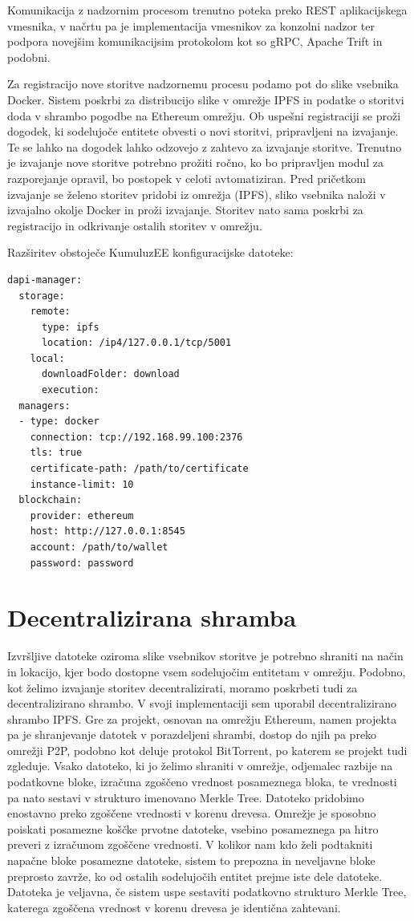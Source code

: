 \documentclass[a4paper, 12pt]{book}
\begin{document}
Komunikacija z nadzornim procesom trenutno poteka preko REST aplikacijskega vmesnika, v načrtu pa je implementacija vmesnikov za konzolni nadzor ter podpora novejšim komunikacijsim protokolom kot so gRPC, Apache Trift in podobni.

Za registracijo nove storitve nadzornemu procesu podamo pot do slike vsebnika Docker.
Sistem poskrbi za distribucijo slike v omrežje IPFS in podatke o storitvi doda v shrambo pogodbe na Ethereum omrežju.
Ob uspešni registraciji se proži dogodek, ki sodelujoče entitete obvesti o novi storitvi, pripravljeni na izvajanje.
Te se lahko na dogodek lahko odzovejo z zahtevo za izvajanje storitve.
Trenutno je izvajanje nove storitve potrebno prožiti ročno, ko bo pripravljen modul za razporejanje opravil, bo postopek v celoti avtomatiziran.
Pred pričetkom izvajanje se želeno storitev pridobi iz omrežja (IPFS), sliko vsebnika naloži v izvajalno okolje Docker in proži izvajanje.
Storitev nato sama poskrbi za registracijo in odkrivanje ostalih storitev v omrežju.

Razširitev obstoječe KumuluzEE konfiguracijske datoteke:

\begin{lstlisting}
dapi-manager:
  storage:
    remote:
      type: ipfs
      location: /ip4/127.0.0.1/tcp/5001
    local:
      downloadFolder: download
      execution:
  managers:
  - type: docker
    connection: tcp://192.168.99.100:2376
    tls: true
    certificate-path: /path/to/certificate
    instance-limit: 10
  blockchain:
    provider: ethereum
    host: http://127.0.0.1:8545
    account: /path/to/wallet
    password: password
\end{lstlisting}

\section{Decentralizirana shramba}
Izvršljive datoteke oziroma slike vsebnikov storitve je potrebno shraniti na način in lokacijo, kjer bodo dostopne vsem sodelujočim entitetam v omrežju.
Podobno, kot želimo izvajanje storitev decentralizirati, moramo poskrbeti tudi za decentralizirano shrambo.
V svoji implementaciji sem uporabil decentralizirano shrambo IPFS.
Gre za projekt, osnovan na omrežju Ethereum, namen projekta pa je shranjevanje datotek v porazdeljeni shrambi, dostop do njih pa preko omrežji P2P, podobno kot deluje protokol BitTorrent, po katerem se projekt tudi zgleduje.
Vsako datoteko, ki jo želimo shraniti v omrežje, odjemalec razbije na podatkovne bloke, izračuna zgoščeno vrednost posameznega bloka, te vrednosti pa nato sestavi v strukturo imenovano Merkle Tree.
Datoteko pridobimo enostavno preko zgoščene vrednosti v korenu drevesa.
Omrežje je sposobno poiskati posamezne koščke prvotne datoteke, vsebino posameznega pa hitro preveri z izračunom zgoščene vrednosti. V kolikor nam kdo želi podtakniti napačne bloke posamezne datoteke, sistem to prepozna in neveljavne bloke preprosto zavrže, ko od ostalih sodelujočih entitet prejme iste dele datoteke. Datoteka je veljavna, če sistem uspe sestaviti podatkovno strukturo Merkle Tree, katerega zgoščena vrednost v korenu drevesa je identična zahtevani. \cite{Ipfs}
\end{document}
